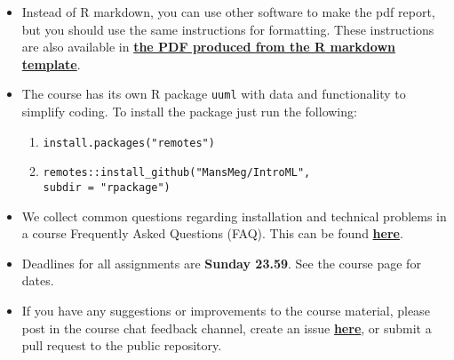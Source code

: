 \begin{itemize}
\item Instead of R markdown, you can use other software to make the pdf report, but you should use the same instructions for formatting. These instructions are also available in \href{https://raw.githubusercontent.com/MansMeg/IntroML/master/templates/assignment_template.pdf}{\textbf{the PDF produced from the R markdown template}}.

\item The course has its own R package \texttt{uuml} with data and functionality to simplify coding. To install the package just run the following:
\begin{enumerate}
\item \texttt{install.packages("remotes")}
\item \texttt{remotes::install\_github("MansMeg/IntroML", \\ subdir = "rpackage")}
\end{enumerate}


\item We collect common questions regarding installation and technical problems in a course Frequently Asked Questions (FAQ). This can be found \href{https://github.com/MansMeg/IntroML/blob/master/FAQ.md}{\textbf{here}}.

\item Deadlines for all assignments are \textbf{Sunday 23.59}. See the course page for dates.

\item If you have any suggestions or improvements to the course material, please post in the course chat feedback channel, create an issue \href{https://github.com/MansMeg/IntroML/issues}{\textbf{here}}, or submit a pull request to the public repository.

\end{itemize}

